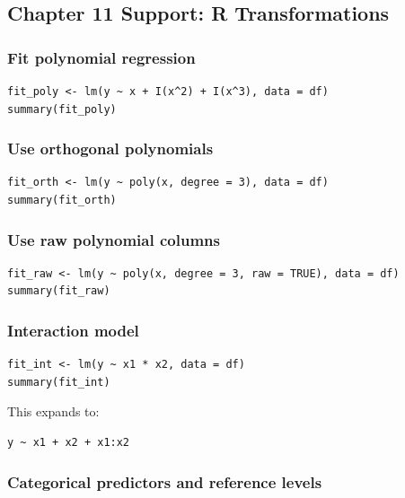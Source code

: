 \subsection{Chapter 11 Support: R Transformations}
\label{app:ch11-software-cookbook-r}

\subsubsection*{Fit polynomial regression}

\begin{verbatim}
fit_poly <- lm(y ~ x + I(x^2) + I(x^3), data = df)
summary(fit_poly)
\end{verbatim}

\subsubsection*{Use orthogonal polynomials}

\begin{verbatim}
fit_orth <- lm(y ~ poly(x, degree = 3), data = df)
summary(fit_orth)
\end{verbatim}

\subsubsection*{Use raw polynomial columns}

\begin{verbatim}
fit_raw <- lm(y ~ poly(x, degree = 3, raw = TRUE), data = df)
summary(fit_raw)
\end{verbatim}

\subsubsection*{Interaction model}

\begin{verbatim}
fit_int <- lm(y ~ x1 * x2, data = df)
summary(fit_int)
\end{verbatim}

This expands to:

\begin{verbatim}
y ~ x1 + x2 + x1:x2
\end{verbatim}

\subsubsection*{Categorical predictors and reference levels}

